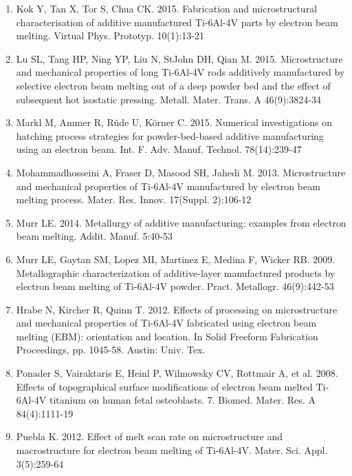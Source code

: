 \documentclass[10pt]{article}
\begin{document}
\begin{enumerate}
  \item Kok Y, Tan X, Tor S, Chua CK. 2015. Fabrication and microstructural characterisation of additive manufactured Ti-6Al-4V parts by electron beam melting. Virtual Phys. Prototyp. 10(1):13-21

  \item Lu SL, Tang HP, Ning YP, Liu N, StJohn DH, Qian M. 2015. Microstructure and mechanical properties of long Ti-6Al-4V rods additively manufactured by selective electron beam melting out of a deep powder bed and the effect of subsequent hot isostatic pressing. Metall. Mater. Trans. A 46(9):3824-34

  \item Markl M, Ammer R, Rüde U, Körner C. 2015. Numerical investigations on hatching process strategies for powder-bed-based additive manufacturing using an electron beam. Int. F. Adv. Manuf. Technol. 78(14):239-47

  \item Mohammadhosseini A, Fraser D, Masood SH, Jahedi M. 2013. Microstructure and mechanical properties of Ti-6Al-4V manufactured by electron beam melting process. Mater. Res. Innov. 17(Suppl. 2):106-12

  \item Murr LE. 2014. Metallurgy of additive manufacturing: examples from electron beam melting. Addit. Manuf. 5:40-53

  \item Murr LE, Gaytan SM, Lopez MI, Martinez E, Medina F, Wicker RB. 2009. Metallographic characterization of additive-layer manufactured products by electron beam melting of Ti-6Al-4V powder. Pract. Metallogr. 46(9):442-53

  \item Hrabe N, Kircher R, Quinn T. 2012. Effects of processing on microstructure and mechanical properties of Ti-6Al-4V fabricated using electron beam melting (EBM): orientation and location. In Solid Freeform Fabrication Proceedings, pp. 1045-58. Austin: Univ. Tex.

  \item Ponader S, Vairaktaris E, Heinl P, Wilmowsky CV, Rottmair A, et al. 2008. Effects of topographical surface modifications of electron beam melted Ti-6Al-4V titanium on human fetal osteoblasts. 7. Biomed. Mater. Res. A 84(4):1111-19

  \item Puebla K. 2012. Effect of melt scan rate on microstructure and macrostructure for electron beam melting of Ti-6Al-4V. Mater. Sci. Appl. 3(5):259-64


\end{enumerate}
\end{document}
